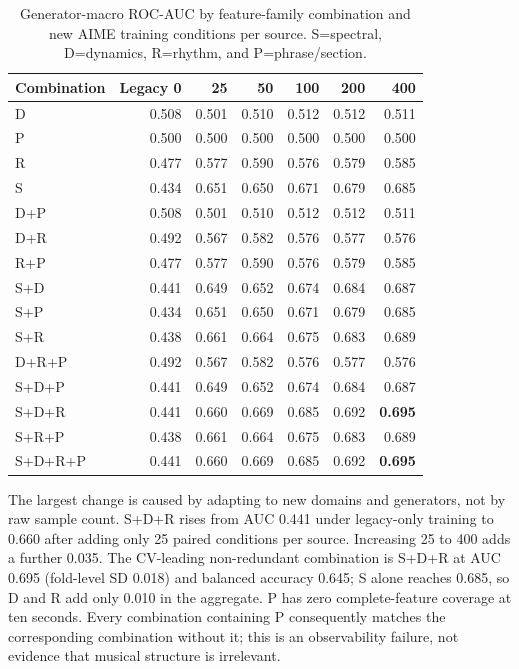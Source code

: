 \begin{table}[H]
\centering
\scriptsize
\setlength{\tabcolsep}{4pt}
\caption{Generator-macro ROC-AUC by feature-family combination and new AIME
training conditions per source.  S=spectral, D=dynamics, R=rhythm, and
P=phrase/section.}
\label{tab:four-family-quantity}
\begin{tabular}{lrrrrrr}
\toprule
Combination & Legacy 0 & 25 & 50 & 100 & 200 & 400 \\
\midrule
D & 0.508 & 0.501 & 0.510 & 0.512 & 0.512 & 0.511 \\
P & 0.500 & 0.500 & 0.500 & 0.500 & 0.500 & 0.500 \\
R & 0.477 & 0.577 & 0.590 & 0.576 & 0.579 & 0.585 \\
S & 0.434 & 0.651 & 0.650 & 0.671 & 0.679 & 0.685 \\
D+P & 0.508 & 0.501 & 0.510 & 0.512 & 0.512 & 0.511 \\
D+R & 0.492 & 0.567 & 0.582 & 0.576 & 0.577 & 0.576 \\
R+P & 0.477 & 0.577 & 0.590 & 0.576 & 0.579 & 0.585 \\
S+D & 0.441 & 0.649 & 0.652 & 0.674 & 0.684 & 0.687 \\
S+P & 0.434 & 0.651 & 0.650 & 0.671 & 0.679 & 0.685 \\
S+R & 0.438 & 0.661 & 0.664 & 0.675 & 0.683 & 0.689 \\
D+R+P & 0.492 & 0.567 & 0.582 & 0.576 & 0.577 & 0.576 \\
S+D+P & 0.441 & 0.649 & 0.652 & 0.674 & 0.684 & 0.687 \\
S+D+R & 0.441 & 0.660 & 0.669 & 0.685 & 0.692 & \textbf{0.695} \\
S+R+P & 0.438 & 0.661 & 0.664 & 0.675 & 0.683 & 0.689 \\
S+D+R+P & 0.441 & 0.660 & 0.669 & 0.685 & 0.692 & \textbf{0.695} \\
\bottomrule
\end{tabular}
\end{table}

The largest change is caused by adapting to new domains and generators, not by
raw sample count.  S+D+R rises from AUC 0.441 under legacy-only training to
0.660 after adding only 25 paired conditions per source.  Increasing 25 to 400
adds a further 0.035.  The CV-leading non-redundant combination is S+D+R at
AUC 0.695 (fold-level SD 0.018) and balanced accuracy 0.645; S alone reaches
0.685, so D and R add only 0.010 in the aggregate.  P has zero complete-feature
coverage at ten seconds.  Every combination containing P consequently matches
the corresponding combination without it; this is an observability failure,
not evidence that musical structure is irrelevant.

